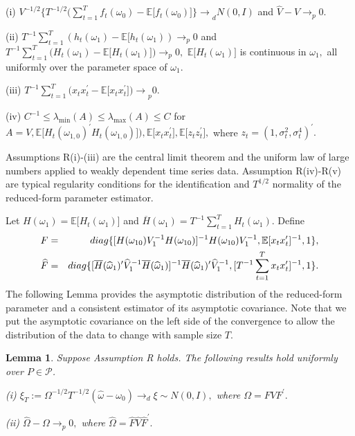 \documentclass[11pt]{article}
\newtheorem{lemma}{Lemma}[section]
\begin{document}
\noindent (i) $V^{-1/2}\{T^{-1/2}(\sum_{t=1}^{T}f_{t}(\omega _{0})-\mathbb{E[%
}f_{t}(\omega _{0})\mathbb{]\} \rightarrow }_{d}N(0,I)$ and $\widehat{V}%
-V\rightarrow _{p}0.$

\noindent (ii) $T^{-1}\sum_{t=1}^{T}(h_{t}(\omega _{1})-\mathbb{E[}%
h_{t}(\omega _{1}))\rightarrow _{p}0$ and $T^{-1}\sum_{t=1}^{T}(H_{t}(\omega
_{1})-\mathbb{E[}H_{t}(\omega _{1})\mathbb{])}\rightarrow _{p}0,$ $\mathbb{E[%
}H_{t}(\omega _{1})\mathbb{]}$ is continuous in $\omega _{1},$ all uniformly
over the parameter space of $\omega _{1}.$

\noindent (iii) $T^{-1}\sum_{t=1}^{T}(x_{t}x_{t}^{\prime }-\mathbb{E[}%
x_{t}x_{t}^{\prime }\mathbb{])\rightarrow }_{p}0.$

\noindent (iv) $C^{-1}\leq \lambda _{\min }(A)\leq \lambda _{\max }(A)\leq C$
for $A=V,\mathbb{E[}H_{t}\left( \omega _{1,0}\right) ^{\prime }H_{t}\left(
\omega _{1,0}\right) ]),\mathbb{E[}x_{t}x_{t}^{\prime }],\mathbb{E[}%
z_{t}z_{t}^{\prime }],$ where $z_{t}=(1,\sigma _{t}^{2},\sigma
_{t}^{4})^{\prime }.$

\smallskip 

Assumptions R(i)-(iii) are the central limit theorem and the uniform law of
large numbers applied to weakly dependent time series data. Assumption
R(iv)-R(v) are typical regularity conditions for the identification and $%
T^{1/2}$ normality of the reduced-form parameter estimator.

Let $H(\omega _{1})=\mathbb{E[}H_{t}(\omega _{1})]$ and $\overline{H}(\omega
_{1})=T^{-1}\sum_{t=1}^{T}H_{t}(\omega _{1}).$ Define%
\begin{eqnarray}
F &=&diag\{[H(\omega _{10})V_{1}^{-1}H(\omega _{10})]^{-1}H(\omega
_{10})V_{1}^{-1},\mathbb{E[}x_{t}x_{t}^{\prime }]^{-1},1\},  \notag \\
\widehat{F} &=&diag\{[\overline{H}(\widehat{\omega }_{1})^{\prime }\widehat{V%
}_{1}^{-1}\overline{H}(\widehat{\omega }_{1})]^{-1}\overline{H}(\widehat{%
\omega }_{1})^{\prime }\widehat{V}_{1}^{-1},[T^{-1}%
\sum_{t=1}^{T}x_{t}x_{t}^{\prime }]^{-1},1\}.  \label{Fhat}
\end{eqnarray}%
The following Lemma provides the asymptotic distribution of the reduced-form
parameter and a consistent estimator of its asymptotic covariance. Note that
we put the asymptotic covariance on the left side of the convergence to
allow the distribution of the data to change with sample size $T.$ 

\begin{lemma}
\label{Lemma Reduce}Suppose Assumption R holds. The following results hold
uniformly over $P\in \mathcal{P}$.

\noindent \emph{(i)} $\xi _{T}:=\Omega ^{-1/2}T^{-1/2}(\widehat{\omega }%
-\omega _{0})\rightarrow _{d}\xi \sim N(0,I),$ where $\Omega =FVF^{\prime }.$

\noindent \emph{(ii)} $\widehat{\Omega }-\Omega \rightarrow _{p}0,$ where $%
\widehat{\Omega }=\widehat{F}\widehat{V}\widehat{F}^{\prime }.$
\end{lemma}
\end{document}
